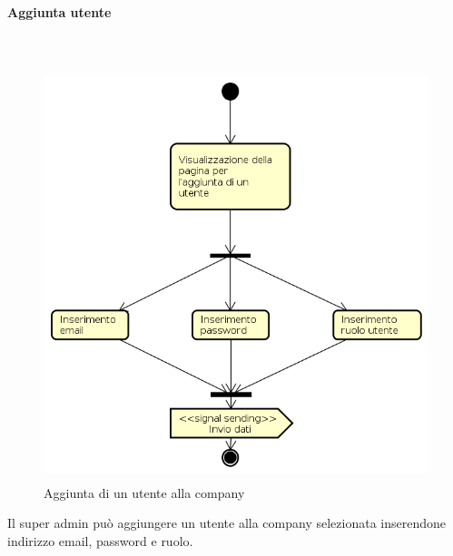 \paragraph{Aggiunta utente} \mbox{} \\
\begin{figure}[H]
\begin{center}
\includegraphics[height=12cm]{res/sections/backend/activities/aggiuntaUtenteSA.png}
\caption{Aggiunta di un utente alla company}
\end{center}
\end{figure}
Il super admin può aggiungere un utente alla company selezionata inserendone indirizzo email, password e ruolo. 

